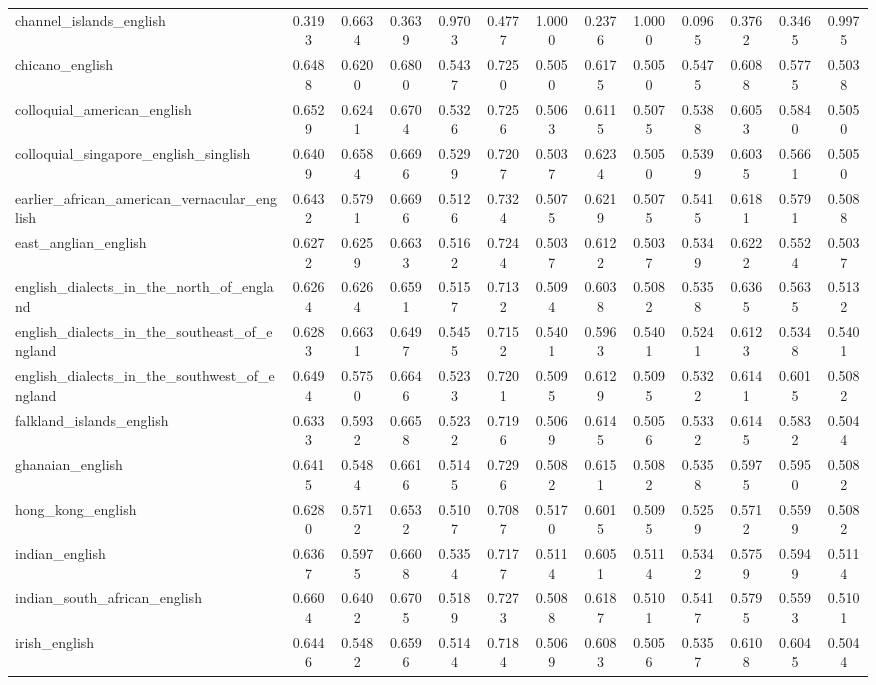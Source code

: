 \begin{landscape}
\begin{longtable}{lcccccccccccc}
channel\_islands\_english & 0.3193 & 0.6634 & 0.3639 & 0.9703 & 0.4777 & 1.0000 & 0.2376 & 1.0000 & 0.0965 & 0.3762 & 0.3465 & 0.9975 \\
chicano\_english & 0.6488 & 0.6200 & 0.6800 & 0.5437 & 0.7250 & 0.5050 & 0.6175 & 0.5050 & 0.5475 & 0.6088 & 0.5775 & 0.5038 \\
colloquial\_american\_english & 0.6529 & 0.6241 & 0.6704 & 0.5326 & 0.7256 & 0.5063 & 0.6115 & 0.5075 & 0.5388 & 0.6053 & 0.5840 & 0.5050 \\
colloquial\_singapore\_english\_singlish & 0.6409 & 0.6584 & 0.6696 & 0.5299 & 0.7207 & 0.5037 & 0.6234 & 0.5050 & 0.5399 & 0.6035 & 0.5661 & 0.5050 \\
earlier\_african\_american\_vernacular\_english & 0.6432 & 0.5791 & 0.6696 & 0.5126 & 0.7324 & 0.5075 & 0.6219 & 0.5075 & 0.5415 & 0.6181 & 0.5791 & 0.5088 \\
east\_anglian\_english & 0.6272 & 0.6259 & 0.6633 & 0.5162 & 0.7244 & 0.5037 & 0.6122 & 0.5037 & 0.5349 & 0.6222 & 0.5524 & 0.5037 \\
english\_dialects\_in\_the\_north\_of\_england & 0.6264 & 0.6264 & 0.6591 & 0.5157 & 0.7132 & 0.5094 & 0.6038 & 0.5082 & 0.5358 & 0.6365 & 0.5635 & 0.5132 \\
english\_dialects\_in\_the\_southeast\_of\_england & 0.6283 & 0.6631 & 0.6497 & 0.5455 & 0.7152 & 0.5401 & 0.5963 & 0.5401 & 0.5241 & 0.6123 & 0.5348 & 0.5401 \\
english\_dialects\_in\_the\_southwest\_of\_england & 0.6494 & 0.5750 & 0.6646 & 0.5233 & 0.7201 & 0.5095 & 0.6129 & 0.5095 & 0.5322 & 0.6141 & 0.6015 & 0.5082 \\
falkland\_islands\_english & 0.6333 & 0.5932 & 0.6658 & 0.5232 & 0.7196 & 0.5069 & 0.6145 & 0.5056 & 0.5332 & 0.6145 & 0.5832 & 0.5044 \\
ghanaian\_english & 0.6415 & 0.5484 & 0.6616 & 0.5145 & 0.7296 & 0.5082 & 0.6151 & 0.5082 & 0.5358 & 0.5975 & 0.5950 & 0.5082 \\
hong\_kong\_english & 0.6280 & 0.5712 & 0.6532 & 0.5107 & 0.7087 & 0.5170 & 0.6015 & 0.5095 & 0.5259 & 0.5712 & 0.5599 & 0.5082 \\
indian\_english & 0.6367 & 0.5975 & 0.6608 & 0.5354 & 0.7177 & 0.5114 & 0.6051 & 0.5114 & 0.5342 & 0.5759 & 0.5949 & 0.5114 \\
indian\_south\_african\_english & 0.6604 & 0.6402 & 0.6705 & 0.5189 & 0.7273 & 0.5088 & 0.6187 & 0.5101 & 0.5417 & 0.5795 & 0.5593 & 0.5101 \\
irish\_english & 0.6446 & 0.5482 & 0.6596 & 0.5144 & 0.7184 & 0.5069 & 0.6083 & 0.5056 & 0.5357 & 0.6108 & 0.6045 & 0.5044 \\

\end{longtable}
\end{landscape}
